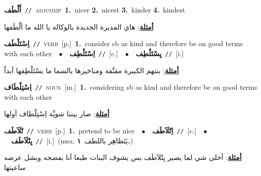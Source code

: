 \documentclass[10pt,a4paper,twoside]{article} %
\begin{document}
\begin{multicols}{2}
{\setlength\topsep{0pt}\textbf{\foreignlanguage{arabic}{أَلْطَف}}\ {\color{gray}\texttt{//}\color{black}}\ \textsc{adj\textunderscore comp}\ \textbf{1.}~nicer  \textbf{2.}~nicest  \textbf{3.}~kinder  \textbf{4.}~kindest\  \begin{flushright}\color{gray}\foreignlanguage{arabic}{\textbf{\underline{\foreignlanguage{arabic}{أمثلة}}}: هاي المديرة الجديدة بالوكالة يا الله ما ألْطَفها}\end{flushright}\color{black}} \vspace{2mm}

{\setlength\topsep{0pt}\textbf{\foreignlanguage{arabic}{اِسْتَلْطَف}}\ {\color{gray}\texttt{//}\color{black}}\ \textsc{verb}\ [p.]\ \textbf{1.}~consider sb as kind and therefore be on good terms with each other\ \ $\bullet$\ \ \setlength\topsep{0pt}\textbf{\foreignlanguage{arabic}{اِسْتَلْطِف}}\ {\color{gray}\texttt{//}\color{black}}\ [c.]\ \ $\bullet$\ \ \setlength\topsep{0pt}\textbf{\foreignlanguage{arabic}{يِسْتَلْطِف}}\ {\color{gray}\texttt{//}\color{black}}\ [i.]\  \begin{flushright}\color{gray}\foreignlanguage{arabic}{\textbf{\underline{\foreignlanguage{arabic}{أمثلة}}}: بنتهم الكبيرة مقنَّفة ومناخيرها بالسما ما بسْتَلْطِفها أبداً}\end{flushright}\color{black}} \vspace{2mm}

{\setlength\topsep{0pt}\textbf{\foreignlanguage{arabic}{اِسْتِلْطَاف}}\ {\color{gray}\texttt{//}\color{black}}\ \textsc{noun}\ [m.]\ \textbf{1.}~considering sb as kind and therefore be on good terms with each other\  \begin{flushright}\color{gray}\foreignlanguage{arabic}{\textbf{\underline{\foreignlanguage{arabic}{أمثلة}}}: صار بيننا شويِّة اِسْتِلْطاف أولها}\end{flushright}\color{black}} \vspace{2mm}

{\setlength\topsep{0pt}\textbf{\foreignlanguage{arabic}{تْلَاَطَف}}\ {\color{gray}\texttt{//}\color{black}}\ \textsc{verb}\ [p.]\ \textbf{1.}~pretend to be nice\ \ $\bullet$\ \ \setlength\topsep{0pt}\textbf{\foreignlanguage{arabic}{اِتْلَاَطَف}}\ {\color{gray}\texttt{//}\color{black}}\ [c.]\ \ $\bullet$\ \ \setlength\topsep{0pt}\textbf{\foreignlanguage{arabic}{يِتْلَاَطَف}}\ {\color{gray}\texttt{//}\color{black}}\ [i.]\ \color{gray}(msa. \foreignlanguage{arabic}{يَتَظاهِر باللطف}~\foreignlanguage{arabic}{\textbf{١.}})\color{black}\  \begin{flushright}\color{gray}\foreignlanguage{arabic}{\textbf{\underline{\foreignlanguage{arabic}{أمثلة}}}: أحلى شي لما يصير يِتْلاَطَف بس يشوف البنات طبعا أنا بفضحه وبشل عرضه ساعيتها}\end{flushright}\color{black}} \vspace{2mm}


\end{multicols}
\end{document}
